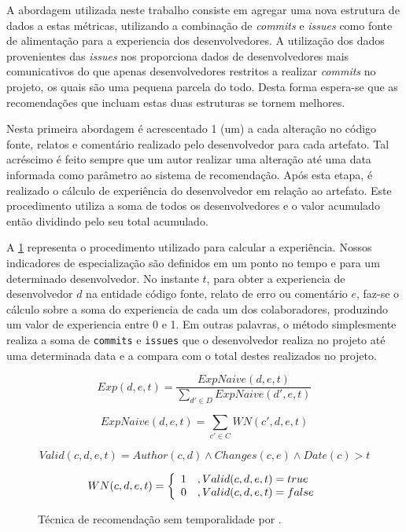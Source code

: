 \documentclass[oneside,brazil,a4paper]{normas-utf-tex}
\begin{document}
A abordagem utilizada neste trabalho consiste em agregar uma nova estrutura de dados a estas métricas, utilizando a combinação de \textit{commits} e \textit{issues} como fonte de alimentação para a experiencia dos desenvolvedores. A utilização dos dados provenientes das \textit{issues} nos proporciona dados de desenvolvedores mais comunicativos do que apenas desenvolvedores restritos a realizar \textit{commits} no projeto, os quais são uma pequena parcela do todo. Desta forma espera-se que as recomendações que incluam estas duas estruturas se tornem melhores. 

Nesta primeira abordagem é acrescentado 1 (um) a cada alteração no código fonte, relatos e comentário realizado pelo desenvolvedor para cada artefato. Tal acréscimo é feito sempre que um autor realizar uma alteração até uma data informada como parâmetro ao sistema de recomendação. Após esta etapa, é realizado o cálculo de experiência do desenvolvedor em relação ao artefato. Este procedimento utiliza a soma de todos os desenvolvedores e o valor acumulado então dividindo pelo seu total acumulado.

A \cref{fig:exp1} representa o procedimento utilizado para calcular a experiência.  Nossos indicadores de especialização são definidos em um ponto no tempo e para um determinado desenvolvedor. No instante $t$, para obter a experiencia de desenvolvedor $d$ na entidade código fonte, relato de erro ou comentário $e$, faz-se o cálculo sobre a soma do experiencia de cada um dos colaboradores, produzindo um valor de experiencia entre 0 e 1. Em outras palavras, o método simplesmente realiza a soma de \texttt{commits} e \texttt{issues} que o desenvolvedor realiza no projeto até uma determinada data e a compara com o total destes realizados no projeto.


\begin{figure}[hbt]
$$
    Exp(d, e, t) = \frac{ExpNaive(d, e, t)}{\sum_{d' \in D} ExpNaive(d', e, t)}
$$

$$
    ExpNaive(d, e, t)  = \sum_{c' \in C} WN(c', d, e, t)
$$

$$
    Valid(c, d, e, t) = Author(c,d) \land Changes(c, e) \land Date(c) > t
$$

$$
    WN(c, d, e, t) = \left\{
        \begin{array}{l l}
            1  & , Valid(c, d, e, t) = true\\
            0  & , Valid(c, d, e, t) = false\\
        \end{array} \right.
$$
    \caption[Técnica de recomendação sem temporalidade.]{Técnica de recomendação sem temporalidade por .}

    \label{fig:exp1}
\end{figure}
\end{document}
